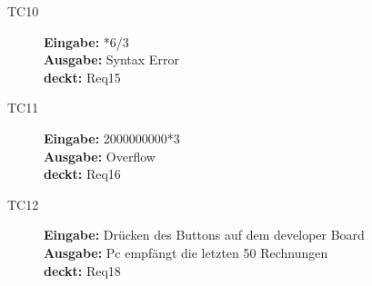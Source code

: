 \begin{description}
 \item[TC10] \textbf{Eingabe:} *6/3\\
  \textbf{Ausgabe:} Syntax Error\\
  \textbf{deckt:} Req15

 \item[TC11] \textbf{Eingabe:} 2000000000*3\\
  \textbf{Ausgabe:} Overflow\\
  \textbf{deckt:} Req16

 \item[TC12] \textbf{Eingabe:} Drücken des Buttons auf dem developer Board\\
  \textbf{Ausgabe:} Pc empfängt die letzten 50 Rechnungen\\
  \textbf{deckt:} Req18

\end{description}
